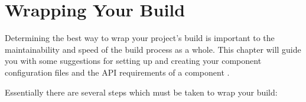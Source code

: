 %
%
%
%
\chapter{Wrapping Your Build}\label{chap:wrapping}

Determining the best way to wrap your project's build is important to
the maintainability and speed of the build process as a whole.  This
chapter will guide you with some suggestions for setting up and
creating your component configuration files and the API requirements
of a component \makefile.

Essentially there are several steps which must be taken to wrap your
build:

